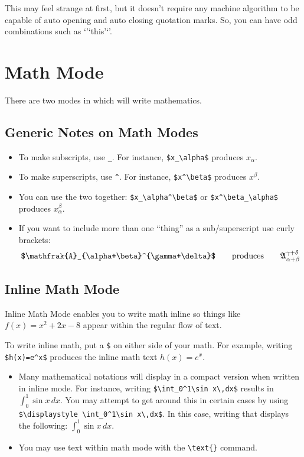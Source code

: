 \documentclass[letterpaper,twoside,10pt]{article}
\begin{document}
\bigbreak This may feel strange at first, but it doesn't require any machine algorithm to be capable
of auto opening and auto closing quotation marks. So, you can have odd combinations such as
`'`this'`'.














\newpage
\section{Math Mode}

There are two modes in which \LaTeXe will write mathematics.

\subsection{Generic Notes on Math Modes}

\begin{itemize}
\item To make subscripts, use \verb!_!. For instance, \verb!$x_\alpha$! produces $x_\alpha$.
\item To make superscripts, use \verb!^!. For instance, \verb!$x^\beta$! produces $x^\beta$.
\item You can use the two together: \verb!$x_\alpha^\beta$! or \verb!$x^\beta_\alpha$! produces $x^\beta_\alpha$.
\item If you want to include more than one ``thing'' as a sub/superscript use curly brackets:
\[
\verb!$\mathfrak{A}_{\alpha+\beta}^{\gamma+\delta}$!\qquad\text{produces}\qquad \displaystyle\mathfrak{A}_{\alpha+\beta}^{\gamma+\delta}
\]

\end{itemize}


\subsection{Inline Math Mode}

Inline Math Mode enables you to write math inline so things like $f(x)=x^2+2x-8$ appear within the
regular flow of text.

\bigbreak To write inline math, put a \verb!$! on either side of your math. For example, writing
\verb!$h(x)=e^x$! produces the inline math text $h(x)=e^x$.

\begin{itemize}
\item Many mathematical notations will display in a compact version when written in inline mode. For
instance, writing \verb!$\int_0^1\sin x\,dx$! results in $\int_0^1\sin x\,dx$. You may attempt to
get around this in certain cases by using \verb!$\displaystyle \int_0^1\sin x\,dx$!. In this case,
writing that displays the following: $\displaystyle \int_0^1\sin x\,dx$.
\item You may use text within math mode with the \verb!\text{}! command.
\end{itemize}
\end{document}
